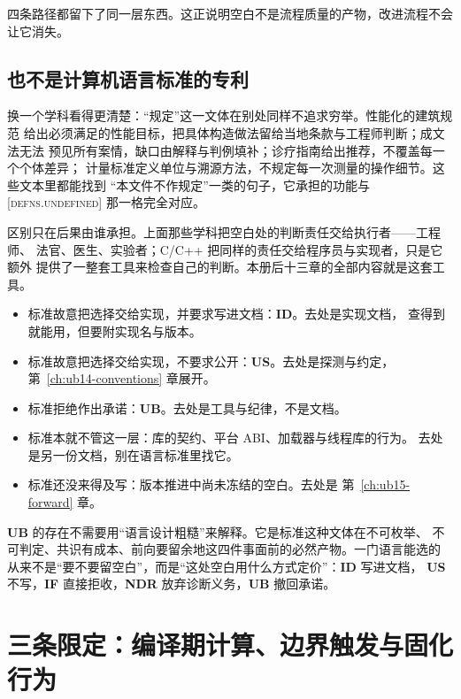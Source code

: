 \documentclass[12pt,a4paper,fontset=fandol]{ctexbook}
\newcommand{\Lang}[1]{\textsf{#1}}
\newcommand{\CL}{\Lang{C}}
\newcommand{\CPP}{\Lang{C++}}
\newcommand{\UB}{\textbf{\textsf{UB}}}
\newcommand{\IDB}{\textbf{\textsf{ID}}}
\newcommand{\USB}{\textbf{\textsf{US}}}
\newcommand{\NDR}{\textbf{\textsf{NDR}}}
\newcommand{\ILLF}{\textbf{\textsf{IF}}}
\newcommand{\Std}[1]{\textsc{[#1]}}
\begin{document}
四条路径都留下了同一层东西。这正说明空白不是流程质量的产物，改进流程不会让它消失。

\subsection{也不是计算机语言标准的专利}\label{sec:ub02-blank-not-cs}

换一个学科看得更清楚：“规定”这一文体在别处同样不追求穷举。性能化的建筑规范
给出必须满足的性能目标，把具体构造做法留给当地条款与工程师判断；成文法无法
预见所有案情，缺口由解释与判例填补；诊疗指南给出推荐，不覆盖每一个个体差异；
计量标准定义单位与溯源方法，不规定每一次测量的操作细节。这些文本里都能找到
“本文件不作规定”一类的句子，它承担的功能与 \Std{defns.undefined} 那一格完全对应。

区别只在后果由谁承担。上面那些学科把空白处的判断责任交给执行者——工程师、
法官、医生、实验者；\CL{}/\CPP{} 把同样的责任交给程序员与实现者，只是它额外
提供了一整套工具来检查自己的判断。本册后十三章的全部内容就是这套工具。

\begin{guideline}[title={看到“标准没写”，先分辨是哪一种留白}]
\begin{itemize}
  \item 标准故意把选择交给实现，并要求写进文档：\IDB{}。去处是实现文档，
        查得到就能用，但要附实现名与版本。
  \item 标准故意把选择交给实现，不要求公开：\USB{}。去处是探测与约定，
        第~\ref{ch:ub14-conventions} 章展开。
  \item 标准拒绝作出承诺：\UB{}。去处是工具与纪律，不是文档。
  \item 标准本就不管这一层：库的契约、平台 ABI、加载器与线程库的行为。
        去处是另一份文档，别在语言标准里找它。
  \item 标准还没来得及写：版本推进中尚未冻结的空白。去处是
        第~\ref{ch:ub15-forward} 章。
\end{itemize}
\end{guideline}

\begin{note}[title={本节的一句话}]
\UB{} 的存在不需要用“语言设计粗糙”来解释。它是标准这种文体在不可枚举、
不可判定、共识有成本、前向要留余地这四件事面前的必然产物。一门语言能选的
从来不是“要不要留空白”，而是“这处空白用什么方式定价”：\IDB{} 写进文档，
\USB{} 不写，\ILLF{} 直接拒收，\NDR{} 放弃诊断义务，\UB{} 撤回承诺。
\end{note}

\section{三条限定：编译期计算、边界触发与固化行为}\label{sec:ub02-three-limits}
\end{document}
